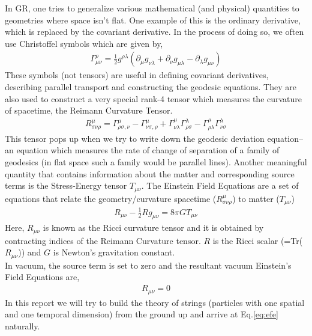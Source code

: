 \documentclass{article}
\begin{document}
In GR, one tries to generalize various mathematical (and physical) quantities to geometries where space isn't flat. One example of this is the ordinary derivative, which is replaced by the covariant derivative. In the process of doing so, we often use Christoffel symbols which are given by,
\begin{align}
    \Gamma^\rho_{\mu\nu} = \frac{1}{2}g^{\rho\lambda}(\partial_\mu g_{\nu\lambda}+\partial_\nu g_{\mu\lambda}-\partial_\lambda g_{\mu\nu})
\end{align}
These symbols (not tensors) are useful in defining covariant derivatives, describing parallel transport and constructing the geodesic equations. They are also used to construct a very special rank-4 tensor which measures the curvature of spacetime, the Reimann Curvature Tensor. 
\begin{align}
    R^\mu_{\sigma\nu\rho} = \Gamma^\mu_{\rho\sigma,\nu}-\Gamma^\mu_{\nu\sigma,\rho}+\Gamma^\mu_{\nu\lambda}\Gamma^\lambda_{\rho\sigma}-\Gamma^\mu_{\rho\lambda}\Gamma^\lambda_{\nu\sigma}
\end{align}
This tensor pops up when we try to write down the geodesic deviation equation-- an equation which measures the rate of change of separation of a family of geodesics (in flat space such a family would be parallel lines). Another meaningful quantity that contains information about the matter and corresponding source terms is the Stress-Energy tensor $T_{\mu\nu}$. The Einstein Field Equations are a set of equations that relate the geometry/curvature spacetime ($R^\mu_{\sigma\nu\rho}$) to matter ($T_{\mu\nu}$)
\begin{align}
    R_{\mu\nu}-\frac{1}{2}Rg_{\mu\nu} = 8\pi GT_{\mu\nu}
\end{align}
Here, $R_{\mu\nu}$ is known as the Ricci curvature tensor and it is obtained by contracting indices of the Reimann Curvature tensor. $R$ is the Ricci scalar (=Tr($R_{\mu\nu}$)) and $G$ is Newton's gravitation constant.\\

In vacuum, the source term is set to zero and the resultant vacuum Einstein's Field Equations are,
\begin{align}
    R_{\mu\nu}=0\label{eq:efe}
\end{align}
In this report we will try to build the theory of strings (particles with one spatial and one temporal dimension) from the ground up and arrive at Eq.\eqref{eq:efe} naturally.
\end{document}
